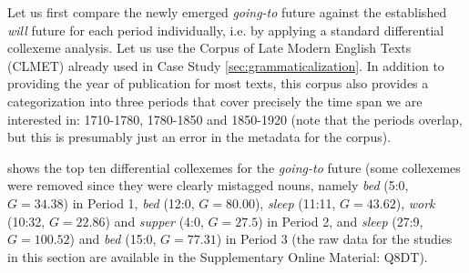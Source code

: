Let us first compare the newly emerged \textit{going\hyp{}to}  future against the established \textit{will} future for each period individually, i.e. by applying a standard differential collexeme  analysis. Let us use the Corpus of Late Modern English Texts (CLMET)  already used in Case Study \ref{sec:grammaticalization}. In addition to providing the year of publication for most texts, this corpus also provides a categorization  into three periods that cover precisely the time span we are interested in: 1710-1780, 1780-1850 and 1850-1920 (note that the periods overlap, but this is presumably just an error in the metadata  for the corpus).

 shows the top ten differential collexemes  for the \textit{going\hyp{}to}  future (some collexemes were removed since they were clearly mistagged nouns,  name\-ly \textit{bed} (5:0, $G = 34.38$) in Period 1, \textit{bed} (12:0, $G = 80.00$), \textit{sleep} (11:11, $G = 43.62$), \textit{work} (10:32, $G = 22.86$) and \textit{supper} (4:0, $G = 27.5$) in Period 2, and \textit{sleep} (27:9, $G = 100.52$) and \textit{bed} (15:0, $G = 77.31$) in Period 3 (the raw data for the studies in this section are available in the Supplementary Online Material: Q8DT).

